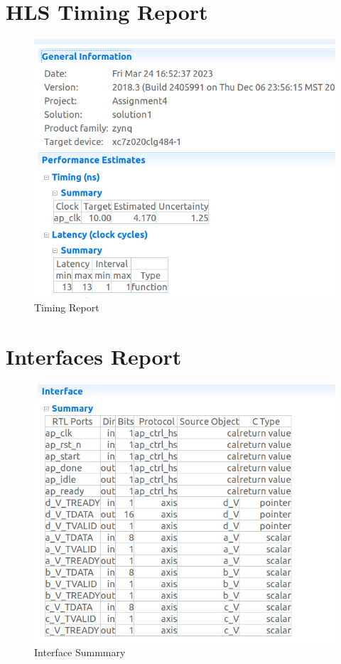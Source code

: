 \documentclass{article}
\begin{document}
\vspace{5cm}


\section{HLS Timing Report}
\vspace{1cm}
\begin{figure}[h]
    \centering
\includegraphics[width=\columnwidth]{figs/2.png}
    \caption{Timing Report}
    \label{fig:my_label}
\end{figure}

\vspace{10cm}


\section{Interfaces Report}
\vspace{1cm}
\begin{figure}[h]
    \centering
\includegraphics[width=\columnwidth]{figs/3.png}
    \caption{Interface Summmary}
    \label{fig:my_label}
\end{figure}
\vspace{5cm}
\end{document}
